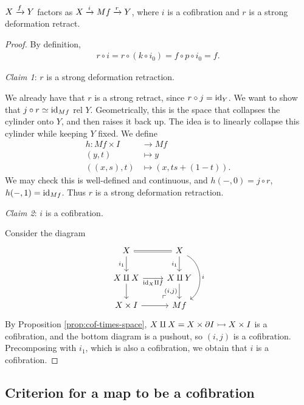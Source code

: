 \documentclass{article}[11pt]
\begin{document}
\begin{proposition} $X\xrightarrow{f} Y$ factors as $X\xrightarrow{i} Mf \xrightarrow{r} Y$, where $i$ is a cofibration and $r$ is a strong deformation retract.
\end{proposition}
\begin{proof} By definition,
\begin{align*}
	r\circ i = r\circ (k\circ i_0) = f\circ p \circ i_0 = f.
\end{align*}

\textit{Claim 1}: $r$ is a strong deformation retraction.

We already have that $r$ is a strong retract, since $r\circ j = \text{id}_Y$. We want to show that $j\circ r \simeq \text{id}_{Mf}$ rel $Y$. Geometrically, this is the space that collapses the cylinder onto $Y$, and then raises it back up. The idea is to linearly collapse this cylinder while keeping $Y$ fixed. We define
\begin{align*}
	h: Mf \times I &\to Mf \\
	(y,t) &\mapsto y \\
	((x,s),t) &\mapsto (x, ts + (1-t)).
\end{align*}
We may check this is well-defined and continuous, and $h(-,0) = j\circ r$, $h(-,1) = \text{id}_{Mf}$. Thus $r$ is a strong deformation retraction.

\textit{Claim 2}: $i$ is a cofibration.

Consider the diagram
\[
	\begin{tikzcd}
	X\rar[equal]\dar["i_1" left] & X\dar["i_1" left]\ar[dd, bend left=60, "i" right] \\
	X\amalg X\dar\rar["\id_X \amalg f" below] & X\amalg Y\dar["{(i,j)}" left] \\
	X\times I\rar & Mf\po
	\end{tikzcd}
\]
By Proposition \ref{prop:cof-times-space}, $X\amalg X = X\times \partial I \rightarrowtail X\times I$ is a cofibration, and the bottom diagram is a pushout, so $(i,j)$ is a cofibration. Precomposing with $i_1$, which is also a cofibration, we obtain that $i$ is a cofibration.
\end{proof}

\subsection{Criterion for a map to be a cofibration}
\end{document}
